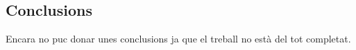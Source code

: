 \thispagestyle{empty}
\subsection*{Conclusions}

Encara no puc donar unes conclusions ja que el treball no està del tot completat.